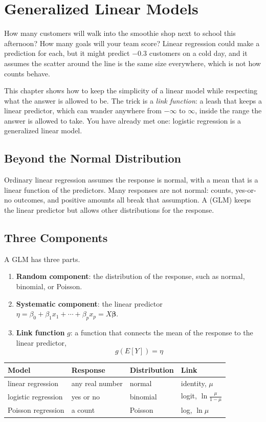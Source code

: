 \chapter{Generalized Linear Models}

How many customers will walk into the smoothie shop next to school this afternoon? How many goals will your
team score? Linear regression could make a prediction for each, but it might predict $-0.3$ customers on a cold
day, and it assumes the scatter around the line is the same size everywhere, which is not how counts behave.

This chapter shows how to keep the simplicity of a linear model while respecting what the answer is allowed to
be. The trick is a \emph{link function}: a leash that keeps a linear predictor, which can wander anywhere from
$-\infty$ to $\infty$, inside the range the answer is allowed to take. You have already met one: logistic
regression is a generalized linear model.

\section{Beyond the Normal Distribution}
Ordinary linear regression assumes the response is normal, with a mean that is a linear function of the
predictors. Many responses are not normal: counts, yes-or-no outcomes, and positive amounts all break that
assumption. A  (GLM) keeps the linear predictor but allows other distributions
for the response.

\section{Three Components}
A GLM has three parts.
\begin{enumerate}
\item \textbf{Random component}: the distribution of the response, such as normal, binomial, or Poisson.
\item \textbf{Systematic component}: the linear predictor
$\eta = \beta_0 + \beta_1 x_1 + \cdots + \beta_p x_p = X\boldsymbol{\beta}$.
\item \textbf{Link function} $g$: a function that connects the mean of the response to the linear predictor,
$$g(E[Y]) = \eta$$
\end{enumerate}

\begin{center}
\begin{tabular}{l l l l}
\textbf{Model} & \textbf{Response} & \textbf{Distribution} & \textbf{Link} \\
\hline
linear regression & any real number & normal & identity, $\mu$ \\
logistic regression & yes or no & binomial & logit, $\ln\frac{\mu}{1 - \mu}$ \\
Poisson regression & a count & Poisson & log, $\ln \mu$ \\
\end{tabular}
\end{center}

